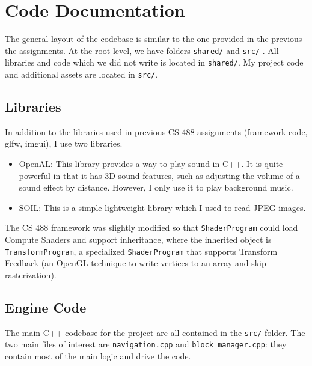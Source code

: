 \documentclass {article}
\begin{document}
\section{Code Documentation}


The general layout of the codebase is similar to the one provided in the previous the assignments. At the root level, we have folders \texttt{shared/} and \texttt{src/} . All libraries and code which we did not write is located in \texttt{shared/}. My project code and additional assets are located in \texttt{src/}.

\subsection{Libraries}

In addition to the libraries used in previous CS 488 assignments (framework code, glfw, imgui), I use two libraries.

\begin{itemize}
\item OpenAL: This library provides a way to play sound in C++. It is quite powerful in that it has 3D sound features, such as adjusting the volume of a sound effect by distance. However, I only use it to play background music.
\item SOIL: This is a simple lightweight library which I used to read JPEG images.
\end{itemize}

The CS 488 framework was slightly modified so that \texttt{ShaderProgram} could load Compute Shaders and support inheritance, where the inherited object is \texttt{TransformProgram}, a specialized \texttt{ShaderProgram} that supports Transform Feedback (an OpenGL technique to write vertices to an array and skip rasterization).

\subsection{Engine Code}

The main C++ codebase for the project are all contained in the \texttt{src/} folder. The two main files of interest are \texttt{navigation.cpp} and \texttt{block\_manager.cpp}: they contain most of the main logic and drive the code.
\end{document}
